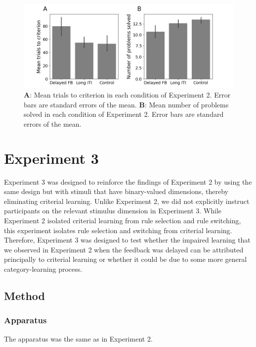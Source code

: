 \documentclass[doc, floatsintext]{apa7}
\begin{document}
% 

\begin{figure}
  \centering
  \includegraphics[width=.8\textwidth]{../figures/fig_exp_1_t2c.png}
    \caption{
        \textbf{A}: Mean trials to criterion in each
        condition of Experiment 2. Error bars are standard
        errors of the mean.
        \textbf{B}: Mean number of problems solved in each
        condition of Experiment 2. Error bars are standard
        errors of the mean.
}
  \label{fig_exp_1_t2c}
\end{figure}

\section{Experiment 3}
Experiment 3 was designed to reinforce the findings of
Experiment 2 by using the same design but with stimuli that
have binary-valued dimensions, thereby eliminating criterial
learning. Unlike Experiment 2, we did not explicitly
instruct participants on the relevant stimulus dimension in
Experiment 3.  While Experiment 2 isolated criterial
learning from rule selection and rule switching, this
experiment isolates rule selection and switching from
criterial learning. Therefore, Experiment 3 was designed to
test whether the impaired learning that we observed in
Experiment 2 when the feedback was delayed can be attributed
principally to criterial learning or whether it could be due
to some more general category-learning process.

\subsection{Method}

\subsubsection{Apparatus}
The apparatus was the same as in Experiment 2.
\end{document}
